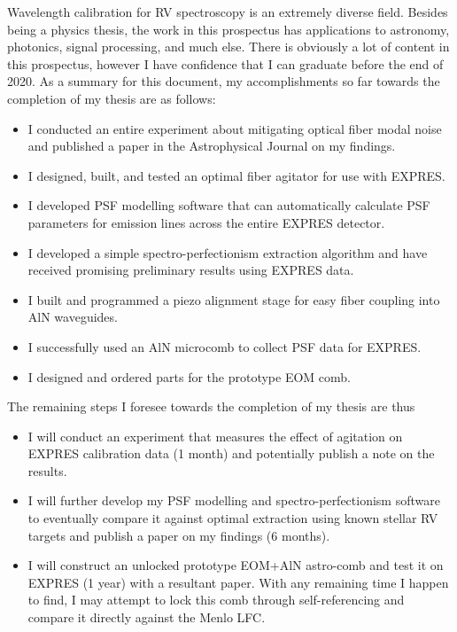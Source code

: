 \documentclass[11pt]{article}
\begin{document}
Wavelength calibration for RV spectroscopy is an extremely diverse field. Besides being a physics thesis, the work in this prospectus has applications to astronomy, photonics, signal processing, and much else. There is obviously a lot of content in this prospectus, however I have confidence that I can graduate before the end of 2020. As a summary for this document, my accomplishments so far towards the completion of my thesis are as follows:
\begin{itemize}
    \item I conducted an entire experiment about mitigating optical fiber modal noise and published a paper in the Astrophysical Journal on my findings.
    \item I designed, built, and tested an optimal fiber agitator for use with EXPRES.
    \item I developed PSF modelling software that can automatically calculate PSF parameters for emission lines across the entire EXPRES detector.
    \item I developed a simple spectro-perfectionism extraction algorithm and have received promising preliminary results using EXPRES data.
    \item I built and programmed a piezo alignment stage for easy fiber coupling into AlN waveguides.
    \item I successfully used an AlN microcomb to collect PSF data for EXPRES.
    \item I designed and ordered parts for the prototype EOM comb.
\end{itemize}
The remaining steps I foresee towards the completion of my thesis are thus
\begin{itemize}
    \item I will conduct an experiment that measures the effect of agitation on EXPRES calibration data (1 month) and potentially publish a note on the results.
    \item I will further develop my PSF modelling and spectro-perfectionism software to eventually compare it against optimal extraction using known stellar RV targets and publish a paper on my findings (6 months).
    \item I will construct an unlocked prototype EOM+AlN astro-comb and test it on EXPRES (1 year) with a resultant paper. With any remaining time I happen to find, I may attempt to lock this comb through self-referencing and compare it directly against the Menlo LFC.
\end{itemize}
\end{document}

